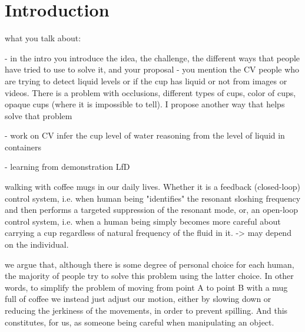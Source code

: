\section{Introduction}

what you talk about:

- in the intro you introduce the idea, the challenge, the different ways that people have tried to use to solve it, and your proposal
- you mention the CV people who are trying to detect liquid levels or if the cup has liquid or not from images or videos. There is a problem with occlusions, different types of cups, color of cups, opaque cups (where it is impossible to tell). I propose another way that helps solve that problem

- work on CV
\cite{yu_fill_2015} infer the cup level of water
\cite{mottaghi_see_2017} reasoning from the level of liquid in containers

- learning from demonstration
\cite{santina_learning_2019} LfD

\cite{mayer_walking_2012} walking with coffee mugs in our daily lives. Whether it is a feedback (closed-loop) control system, i.e. when human being "identifies" the resonant sloshing frequency and then performs a targeted suppression of the resonant mode, or, an open-loop control system, i.e. when a human being simply becomes more careful about carrying a cup regardless of natural frequency of the fluid in it. -> may depend on the individual.

we argue that, although there is some degree of personal choice for each human, the majority of people try to solve this problem using the latter choice. In other words, to simplify the problem of moving from point A to point B with a mug full of coffee we instead just adjust our motion, either by slowing down or reducing the jerkiness of the movements, in order to prevent spilling. And this constitutes, for us, as someone being careful when manipulating an object. 


